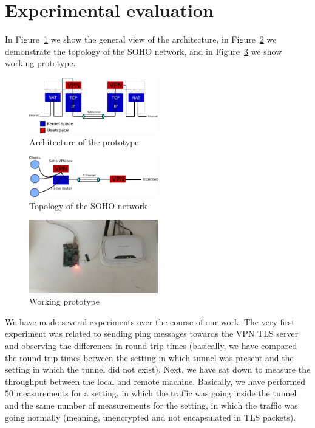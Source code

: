 \section{Experimental evaluation}
\label{section:experiments}



In Figure~\ref{fig:arch} we show the general view of the architecture, 
in Figure~\ref{fig:topo} we demonstrate the topology of the SOHO network, and in 
Figure~\ref{fig:prototype} we show working prototype.

\begin{figure}[!h]
        \includegraphics[width=0.5\textwidth]{graphics/architecture.png}
        \caption{Architecture of the prototype}
        \label{fig:arch}
\end{figure}

\begin{figure}[!h]
        \includegraphics[width=0.5\textwidth]{graphics/topology.png}
        \caption{Topology of the SOHO network}
        \label{fig:topo}
\end{figure}

\begin{figure}[!h]
        \includegraphics[width=0.5\textwidth]{graphics/prototype.jpg}
        \caption{Working prototype}
        \label{fig:prototype}
\end{figure}

We have made several experiments over the course of our work. The very first experiment was 
related to sending ping messages towards the VPN TLS server and observing the differences in
round trip times (basically, we have compared the round trip times between the setting in 
which tunnel was present and the setting in which the tunnel did not exist). Next, we have
sat down to measure the throughput between the local and remote machine. Basically, we have 
performed $50$ measurements for a setting, in which the traffic was going inside the tunnel
and the same number of measurements for the setting, in which the traffic was going 
normally (meaning, unencrypted and not encapsulated in TLS packets).

